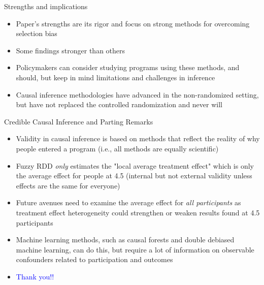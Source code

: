 \documentclass{beamer}
\begin{document}
\begin{frame}{Strengths and implications}

\begin{itemize}
\item Paper's strengths are its rigor and focus on strong methods for overcoming selection bias
\item Some findings stronger than others
\item Policymakers can consider studying programs using these methods, and should, but keep in mind limitations and challenges in inference
\item Causal inference methodologies have advanced in the non-randomized setting, but have not replaced the controlled randomization and never will
\end{itemize}

\end{frame}

\begin{frame}{Credible Causal Inference and Parting Remarks}

\begin{itemize}

\item Validity in causal inference is based on methods that reflect the reality of why people entered a program (i.e., all methods are equally scientific)
\item Fuzzy RDD \emph{only} estimates the "local average treatment effect" which is only the average effect for people at 4.5 (internal but not external validity unless effects are the same for everyone)
\item Future avenues need to examine the average effect for \emph{all participants} as treatment effect heterogeneity could strengthen or weaken results found at 4.5
participants
\item Machine learning methods, such as causal forests and double debiased machine learning, can do this, but require a lot of information on observable confounders related to participation and outcomes
\item \textcolor{blue}{Thank you!!}

\end{itemize}

\end{frame}

\end{document}
